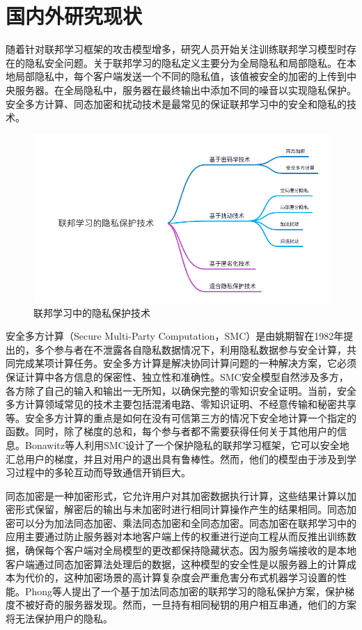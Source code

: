 \section{国内外研究现状}
随着针对联邦学习框架的攻击模型增多，研究人员开始关注训练联邦学习模型时存在的隐私安全问题。关于联邦学习的隐私定义主要分为全局隐私和局部隐私。在本地局部隐私中，每个客户端发送一个不同的隐私值，该值被安全的加密的上传到中央服务器。在全局隐私中，服务器在最终输出中添加不同的噪音以实现隐私保护。安全多方计算、同态加密和扰动技术是最常见的保证联邦学习中的安全和隐私的技术。

\begin{figure}[!hbt]
\centering
	\includegraphics[scale=0.4]{fig2/C1/联邦学习隐私保护技术}%
	\caption{联邦学习中的隐私保护技术}
	\label{fig:联邦学习中的隐私保护技术}	
\end{figure}

安全多方计算（Secure Multi-Party Computation，SMC）是由姚期智在1982年提出的，多个参与者在不泄露各自隐私数据情况下，利用隐私数据参与安全计算，共同完成某项计算任务。安全多方计算是解决协同计算问题的一种解决方案，它必须保证计算中各方信息的保密性、独立性和准确性。SMC安全模型自然涉及多方，各方除了自己的输入和输出一无所知，以确保完整的零知识安全证明。当前，安全多方计算领域常见的技术主要包括混淆电路、零知识证明、不经意传输和秘密共享等。安全多方计算的重点是如何在没有可信第三方的情况下安全地计算一个指定的函数。同时，除了梯度的总和，每个参与者都不需要获得任何关于其他用户的信息。Bonawitz等人利用SMC设计了一个保护隐私的联邦学习框架，它可以安全地汇总用户的梯度，并且对用户的退出具有鲁棒性。然而，他们的模型由于涉及到学习过程中的多轮互动而导致通信开销巨大。

同态加密是一种加密形式，它允许用户对其加密数据执行计算，这些结果计算以加密形式保留，解密后的输出与未加密时进行相同计算操作产生的结果相同。同态加密可以分为加法同态加密、乘法同态加密和全同态加密。同态加密在联邦学习中的应用主要通过防止服务器对本地客户端上传的权重进行逆向工程从而反推出训练数据，确保每个客户端对全局模型的更改都保持隐藏状态。因为服务端接收的是本地客户端通过同态加密算法处理后的数据，这种模型的安全性是以服务器上的计算成本为代价的，这种加密场景的高计算复杂度会严重危害分布式机器学习设置的性能。Phong等人提出了一个基于加法同态加密的联邦学习的隐私保护方案，保护梯度不被好奇的服务器发现。然而，一旦持有相同秘钥的用户相互串通，他们的方案将无法保护用户的隐私。


